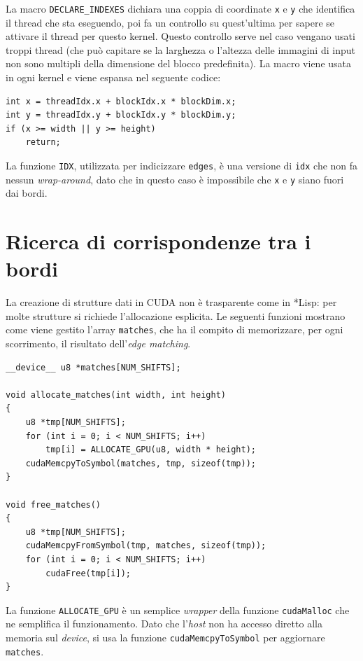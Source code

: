 \documentclass[12pt,a4paper,openright,twoside]{report}
\begin{document}
La macro \verb|DECLARE_INDEXES| dichiara una coppia di coordinate \verb|x| e \verb|y| che identifica il thread che sta eseguendo, poi fa un controllo su quest'ultima per sapere se attivare il thread per questo kernel. Questo controllo serve nel caso vengano usati troppi thread (che può capitare se la larghezza o l'altezza delle immagini di input non sono multipli della dimensione del blocco predefinita). La macro viene usata in ogni kernel e viene espansa nel seguente codice:

\begin{lstlisting}
int x = threadIdx.x + blockIdx.x * blockDim.x;
int y = threadIdx.y + blockIdx.y * blockDim.y;
if (x >= width || y >= height)
    return;
\end{lstlisting}

La funzione \verb|IDX|, utilizzata per indicizzare \verb|edges|, è una versione di \verb|idx| che non fa nessun \textit{wrap-around}, dato che in questo caso è impossibile che \verb|x| e \verb|y| siano fuori dai bordi.

\section{Ricerca di corrispondenze tra i bordi}

La creazione di strutture dati in CUDA non è trasparente come in *Lisp: per molte strutture si richiede l'allocazione esplicita. Le seguenti funzioni mostrano come viene gestito l'array \verb|matches|, che ha il compito di memorizzare, per ogni scorrimento, il risultato dell'\textit{edge matching}.

\begin{lstlisting}[style=mystyle]
__device__ u8 *matches[NUM_SHIFTS];

void allocate_matches(int width, int height)
{
    u8 *tmp[NUM_SHIFTS];
    for (int i = 0; i < NUM_SHIFTS; i++)
        tmp[i] = ALLOCATE_GPU(u8, width * height);
    cudaMemcpyToSymbol(matches, tmp, sizeof(tmp));
}

void free_matches()
{
    u8 *tmp[NUM_SHIFTS];
    cudaMemcpyFromSymbol(tmp, matches, sizeof(tmp));
    for (int i = 0; i < NUM_SHIFTS; i++)
        cudaFree(tmp[i]);
}
\end{lstlisting}

La funzione \verb|ALLOCATE_GPU| è un semplice \textit{wrapper} della funzione \verb|cudaMalloc| che ne semplifica il funzionamento. Dato che l'\textit{host} non ha accesso diretto alla memoria sul \textit{device}, si usa la funzione \verb|cudaMemcpyToSymbol| per aggiornare \verb|matches|.
\end{document}
